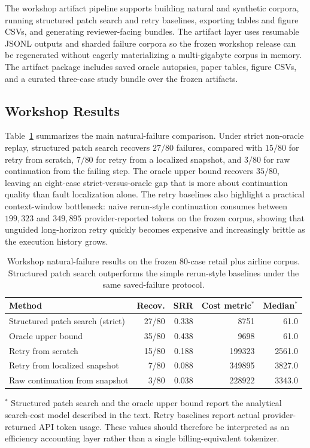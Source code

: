 \documentclass{article}
\begin{document}
The workshop artifact pipeline supports building natural and synthetic corpora,
running structured patch search and retry baselines, exporting tables and
figure CSVs, and generating reviewer-facing bundles. The artifact layer uses
resumable JSONL outputs and sharded failure corpora so the frozen workshop
release can be regenerated without eagerly materializing a multi-gigabyte
corpus in memory. The artifact package includes saved oracle autopsies, paper
tables, figure CSVs, and a curated three-case study bundle over the frozen
artifacts.

\subsection*{Workshop Results}

Table~\ref{tab:workshop_natural_results} summarizes the main natural-failure
comparison. Under strict non-oracle replay, structured patch search recovers
$27/80$ failures, compared with $15/80$ for retry from scratch, $7/80$ for
retry from a localized snapshot, and $3/80$ for raw continuation from the
failing step. The oracle upper bound
recovers $35/80$, leaving an eight-case strict-versus-oracle gap that is more
about continuation quality than fault localization alone. The retry baselines
also highlight a practical context-window bottleneck: naive rerun-style
continuation consumes between $199{,}323$ and $349{,}895$ provider-reported
tokens on the frozen corpus, showing that unguided long-horizon retry quickly
becomes expensive and increasingly brittle as the execution history grows.

\begin{table}[t]
\centering
\small
\begin{tabular}{lrrrr}
\toprule
Method & Recov. & SRR & Cost metric$^{*}$ & Median$^{*}$ \\
\midrule
Structured patch search (strict) & 27/80 & 0.338 & 8751 & 61.0 \\
Oracle upper bound & 35/80 & 0.438 & 9698 & 61.0 \\
Retry from scratch & 15/80 & 0.188 & 199323 & 2561.0 \\
Retry from localized snapshot & 7/80 & 0.088 & 349895 & 3827.0 \\
Raw continuation from snapshot & 3/80 & 0.038 & 228922 & 3343.0 \\
\bottomrule
\end{tabular}
\caption{Workshop natural-failure results on the frozen $80$-case retail plus
airline corpus. Structured patch search outperforms the simple rerun-style
baselines under the same saved-failure protocol.}
\vspace{0.25em}

\begin{minipage}{0.96\linewidth}
\footnotesize
$^{*}$ Structured patch search and the oracle upper bound report the analytical
search-cost model described in the text. Retry baselines report actual
provider-returned API token usage. These values should therefore be interpreted
as an efficiency accounting layer rather than a single billing-equivalent
tokenizer.
\end{minipage}
\label{tab:workshop_natural_results}
\end{table}
\end{document}
